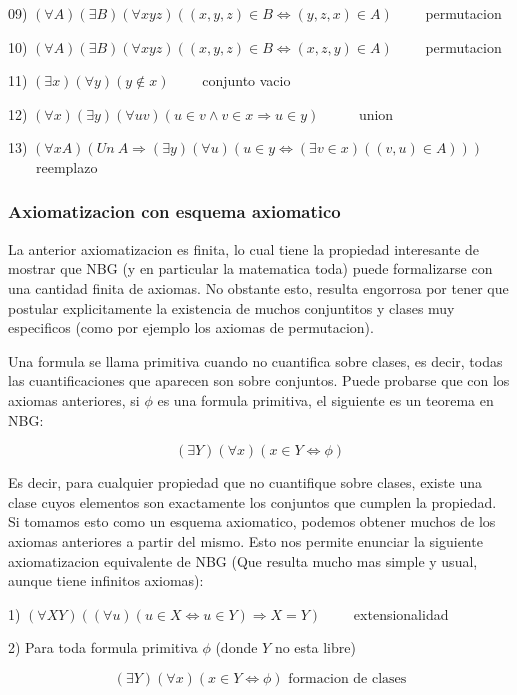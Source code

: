 \documentclass[12pt]{article}
\begin{document}
09) $(\forall A) (\exists B) (\forall xyz) ((x,y,z) \in B \Leftrightarrow (y,z,x) \in A)$ \ \ \ \ permutacion

10) $(\forall A) (\exists B) (\forall xyz) ((x,y,z) \in B \Leftrightarrow (x,z,y) \in A)$ \ \ \ \ permutacion

11) $(\exists x) (\forall y) (y \notin x)$ \ \ \ \ conjunto vacio

12) $(\forall x) (\exists y) (\forall uv) (u \in v \wedge v \in x \Rightarrow u \in y)$  \ \ \ \ \ union

13) $(\forall xA) (Un \ A \Rightarrow (\exists y) (\forall u) (u \in y \Leftrightarrow (\exists v \in x)( (v,u) \in A)))$ \ \ \ \ reemplazo

\subsubsection{Axiomatizacion con esquema axiomatico}

La anterior axiomatizacion es finita, lo cual tiene la propiedad interesante de mostrar que NBG (y en particular la matematica toda) puede
formalizarse con una cantidad finita de axiomas. No obstante esto, resulta engorrosa por tener que postular explicitamente la existencia
de muchos conjuntitos y clases muy especificos (como por ejemplo los axiomas de permutacion).

Una formula se llama primitiva cuando no cuantifica sobre clases, es decir, todas las cuantificaciones que aparecen son sobre conjuntos.
Puede probarse que con los axiomas anteriores, si $\phi$ es una formula primitiva, el siguiente es un teorema en NBG:

$$(\exists Y)(\forall x) (x \in Y \Leftrightarrow \phi)$$

Es decir, para cualquier propiedad que no cuantifique sobre clases, existe una clase cuyos elementos son exactamente los conjuntos que cumplen
la propiedad. Si tomamos esto como un esquema axiomatico, podemos obtener muchos de los axiomas anteriores a partir del mismo. Esto nos
permite enunciar la siguiente axiomatizacion equivalente de NBG (Que resulta mucho mas simple y usual, aunque tiene infinitos axiomas):

1) $(\forall XY)((\forall u)(u \in X \Leftrightarrow u \in Y) \Rightarrow X = Y)$ \ \ \ \ extensionalidad

2) Para toda formula primitiva $\phi$ (donde $Y$ no esta libre)

$$ (\exists Y)(\forall x) (x \in Y \Leftrightarrow \phi) \mbox{\ \ \ \ \ formacion de clases}$$ 
\end{document}
